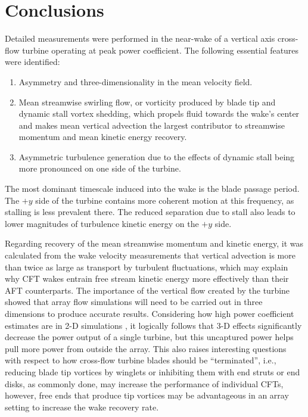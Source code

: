 \section{Conclusions}

Detailed measurements were performed in the near-wake of a vertical axis
cross-flow turbine operating at peak power coefficient. The following essential
features were identified:

\begin{enumerate}
    \item Asymmetry and three-dimensionality in the mean velocity field. 
    
    \item Mean streamwise swirling flow, or vorticity produced by blade tip and
    dynamic stall vortex shedding, which propels fluid towards the wake's center
    and makes mean vertical advection the largest contributor to streamwise
    momentum and mean kinetic energy recovery.
    
    \item Asymmetric turbulence generation due to the effects of dynamic stall
    being more pronounced on one side of the turbine.
\end{enumerate}

The most dominant timescale induced into the wake is the blade passage period. 
The $+y$ side of the turbine contains more coherent motion at this
frequency, as stalling is less prevalent there. The reduced separation due to 
stall also leads to lower magnitudes of turbulence kinetic energy on the $+y$ 
side. 

Regarding recovery of the mean streamwise momentum and kinetic energy, it was
calculated from the wake velocity measurements that vertical advection is more
than twice as large as transport by turbulent fluctuations, which may explain
why CFT wakes entrain free stream kinetic energy more effectively than their AFT
counterparts. The importance of the vertical flow created by the turbine showed
that array flow simulations will need to be carried out in three dimensions to
produce accurate results. Considering how high power coefficient estimates are
in 2-D simulations \cite{Li2013}, it logically follows that 3-D effects
significantly decrease the power output of a single turbine, but this uncaptured
power helps pull more power from outside the array. This also raises interesting
questions with respect to how cross-flow turbine blades should be
``terminated'', i.e., reducing blade tip vortices by winglets or inhibiting them
with end struts or end disks, as commonly done, may increase the performance of
individual CFTs, however, free ends that produce tip vortices may be
advantageous in an array setting to increase the wake recovery rate.

